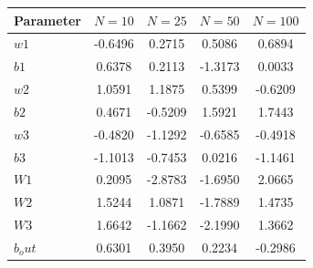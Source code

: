 \begin{tabular}{lcccc}
\hline
Parameter & $N=10$ & $N=25$ & $N=50$ & $N=100$ \\
\hline
$w1$ & -0.6496 & 0.2715 & 0.5086 & 0.6894 \\
$b1$ & 0.6378 & 0.2113 & -1.3173 & 0.0033 \\
$w2$ & 1.0591 & 1.1875 & 0.5399 & -0.6209 \\
$b2$ & 0.4671 & -0.5209 & 1.5921 & 1.7443 \\
$w3$ & -0.4820 & -1.1292 & -0.6585 & -0.4918 \\
$b3$ & -1.1013 & -0.7453 & 0.0216 & -1.1461 \\
$W1$ & 0.2095 & -2.8783 & -1.6950 & 2.0665 \\
$W2$ & 1.5244 & 1.0871 & -1.7889 & 1.4735 \\
$W3$ & 1.6642 & -1.1662 & -2.1990 & 1.3662 \\
$b_out$ & 0.6301 & 0.3950 & 0.2234 & -0.2986 \\
\hline
\end{tabular}
